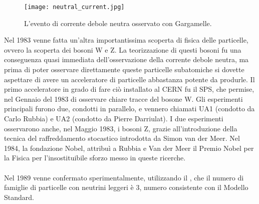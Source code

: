 			\begin{figure}[h!]
				\begin{center}
					\texttt{[image: neutral\_current.jpg]}
				\end{center}
				\caption[Corrente debole neutra]{L'evento di corrente debole neutra osservato con Gargamelle.}
				\label{fig:corrente_debole_neutra}
			\end{figure}
			\noindent
			Nel 1983 venne fatta un'altra importantissima scoperta di fisica delle particelle, ovvero la scoperta dei bosoni W e Z. La teorizzazione di questi bosoni fu una conseguenza quasi immediata dell'osservazione della corrente debole neutra, ma prima di poter osservare direttamente queste particelle subatomiche si dovette aspettare di avere un acceleratore di particelle abbastanza potente da produrle. Il primo acceleratore in grado di fare ciò installato al \ac{CERN} fu il \ac{SPS}, che permise, nel Gennaio del 1983 di osservare chiare tracce del bosone W. Gli esperimenti principali furono due, condotti in parallelo, e vennero chiamati UA1 (condotto da Carlo Rubbia) e UA2 (condotto da Pierre Darriulat). I due esperimenti osservarono anche, nel Maggio 1983, i bosoni Z, grazie all'introduzione della tecnica del raffreddamento stocastico introdotta da Simon van der Meer. Nel 1984, la fondazione Nobel, attribuì a Rubbia e Van der Meer il Premio Nobel per la Fisica per l'insostituibile sforzo messo in queste ricerche.\\
			\\
			Nel 1989 venne confermato sperimentalmente, utilizzando il , che il numero di famiglie di particelle con neutrini leggeri è 3, numero consistente con il Modello Standard.\\
			
